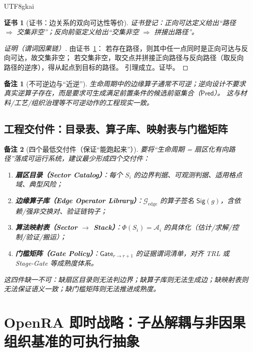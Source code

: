 \documentclass[12pt]{article}
\newtheorem{remark}{备注}[section]
\newtheorem{Certificate}{证书}[section]
\begin{document}
\begin{CJK*}{UTF8}{gkai}
\begin{Certificate}[证书：边关系的双向可达性等价]
\label{cert:bidirectional-search-correctness}
证书登记：正向可达定义给出“路径 $\Rightarrow$ 交集非空”；反向前驱定义给出“交集非空 $\Rightarrow$ 拼接出路径”。
\end{Certificate}

\begin{proof}[证明（谓词因果链）]
由证书~\ref{cert:bidirectional-search-correctness}：
若存在路径，则其中任一点同时是正向可达与反向可达，故交集非空；
若交集非空，取交点并拼接正向路径与反向路径（取反向路径的逆序），得从起点到目标的路径。
引理成立。证毕。
\end{proof}

\begin{remark}[不可逆边与“近逆”]
生命周期中的边缘算子通常不可逆；逆向设计不要求真实逆算子存在，而是要求可生成满足前置条件的候选前驱集合（$\mathsf{Pred}$）。
这与材料/工艺/组织治理等不可逆动作的工程现实一致。
\end{remark}

\subsection{工程交付件：目录表、算子库、映射表与门槛矩阵}
\label{sec:lifecycle-deliverables}

\begin{remark}[四个最低交付件（保证“能跑起来”）]
要将“生命周期 = 扇区化有向路径”落成可运行系统，建议最少形成四个交付件：
\begin{enumerate}
  \item \textbf{扇区目录（Sector Catalog）}：每个 $S_i$ 的边界判据、可观测判据、适用格点域、典型风险；
  \item \textbf{边缘算子库（Edge Operator Library）}：$\mathcal{G}_{\mathrm{edge}}$ 的算子签名 $\mathsf{Sig}(g)$，含依赖/强非交换对、验证链钩子；
  \item \textbf{算法映射表（Sector $\to$ Stack）}：$\Phi(S_i)=\mathcal{A}_i$ 的具体化（估计/求解/控制/验证/搬运）；
  \item \textbf{门槛矩阵（Gate Policy）}：$\mathsf{Gate}_{r\to r+1}$ 的证据谓词清单，对齐 \textsf{TRL}\cite{ref_nasa_trl} 或
    \textsf{Stage-Gate}\cite{ref_stage_gate_dtl} 等成熟度体系。
\end{enumerate}
这四件缺一不可：缺扇区目录则无法判边界；缺算子库则无法生成边；缺映射表则无法保证语义一致；缺门槛矩阵则无法推进成熟度。
\end{remark}

\section{OpenRA 即时战略：子丛解耦与非因果组织基准的可执行抽象}
\label{sec:openra-subbundle-noncausal-basis}


\end{CJK*}
\end{document}
